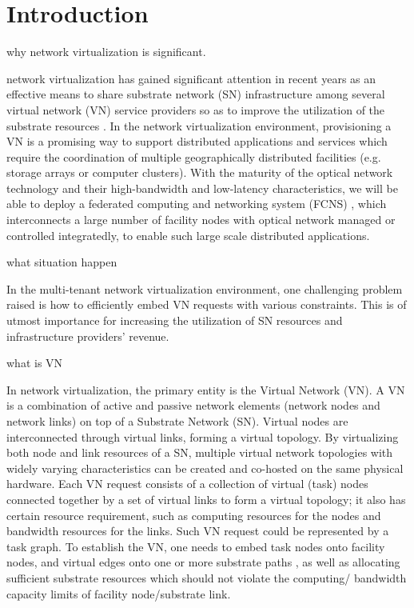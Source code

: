 
\section{Introduction}
why network virtualization is significant.

network virtualization has gained significant attention in recent years as an effective means to share substrate network (SN) infrastructure among several virtual network (VN) service providers so as to improve the utilization of the substrate resources \cite{armbrust2009above,yu2008rethinking}. In the network virtualization environment, provisioning a VN is a promising way to support distributed applications and services which require the coordination of multiple geographically distributed facilities (e.g. storage arrays or computer clusters). With the maturity of the optical network technology and their high-bandwidth and low-latency characteristics, we will be able to deploy a federated computing and networking system (FCNS) \cite{zhang2013effective,papagianni2013optimal}, which interconnects a large number of facility nodes with optical network managed or controlled integratedly, to enable such large scale distributed applications.

what situation happen

In the multi-tenant network virtualization environment, one challenging problem raised is how to efficiently embed VN requests with various constraints. This is of utmost importance for increasing the utilization of SN resources and infrastructure providers’ revenue.

what is VN

In network virtualization, the primary entity is the Virtual Network (VN). A VN is a combination of active and passive network elements (network nodes and network links) on top of a Substrate Network (SN). Virtual nodes are interconnected through virtual links, forming a virtual topology. By virtualizing both node and link resources of a SN, multiple virtual network topologies with widely varying characteristics can be created and co-hosted on the same physical hardware.
Each VN request consists of a collection of virtual (task) nodes connected together by a set of virtual links to form a virtual topology; it also has certain resource requirement, such as computing resources for the nodes and bandwidth resources for the links. Such VN request could be represented by a task graph. To establish the VN, one needs to embed task nodes onto facility nodes, and virtual edges onto one or more substrate paths\cite{yu2008rethinking} , as well as allocating sufficient substrate resources which should not violate the computing/ bandwidth capacity limits of facility node/substrate link.



